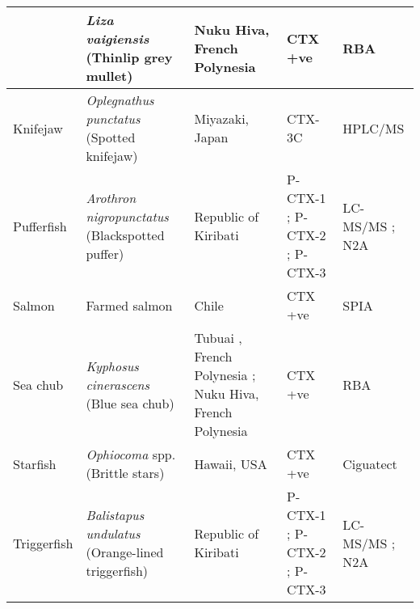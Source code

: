 \documentclass[12pt]{article}
\begin{document}
\begin{longtable}{ | p{2cm} | p{3cm} | p{4.5cm} | p{2cm} | p{3cm} | }
	& \emph{Liza vaigiensis} (Thinlip grey mullet) & Nuku Hiva, French Polynesia \cite{darius2007ciguatera} & CTX +ve \cite{darius2007ciguatera} & RBA \cite{darius2007ciguatera} \\
	\hline
	Knifejaw & \emph{Oplegnathus punctatus} (Spotted knifejaw) & Miyazaki, Japan \cite{yogi2011detailed} & CTX-3C \cite{yogi2011detailed} & HPLC/MS \cite{yogi2011detailed}\\
	\hline
Pufferfish & \emph{Arothron nigropunctatus} (Blackspotted puffer) & Republic of Kiribati \cite{mak2013pacific} & P-CTX-1 \cite{mak2013pacific}; P-CTX-2 \cite{mak2013pacific}; P-CTX-3 \cite{mak2013pacific} & LC-MS/MS \cite{mak2013pacific}; N2A \cite{mak2013pacific} \\
\hline
	Salmon & Farmed salmon & Chile \cite{ebesu1994first} & CTX +ve \cite{ebesu1994first} & SPIA \cite{ebesu1994first}\\
	\hline
	Sea chub & \emph{Kyphosus cinerascens} (Blue sea chub) & Tubuai , French Polynesia \cite{darius2007ciguatera}; Nuku Hiva, French Polynesia \cite{darius2007ciguatera} & CTX +ve \cite{darius2007ciguatera} & RBA \cite{darius2007ciguatera} \\
	\hline
	Starfish & \emph{Ophiocoma} spp. (Brittle stars) & Hawaii, USA \cite{park2000microbial} & CTX +ve \cite{park2000microbial} & Ciguatect \textregistered \cite{park2000microbial} \\
	\hline
Triggerfish	& \emph{Balistapus undulatus} (Orange-lined triggerfish) & Republic of Kiribati \cite{mak2013pacific} & P-CTX-1 \cite{mak2013pacific}; P-CTX-2 \cite{mak2013pacific}; P-CTX-3 \cite{mak2013pacific} & LC-MS/MS \cite{mak2013pacific}; N2A \cite{mak2013pacific} \\
	\end{longtable}
		\FloatBarrier
\end{document}
